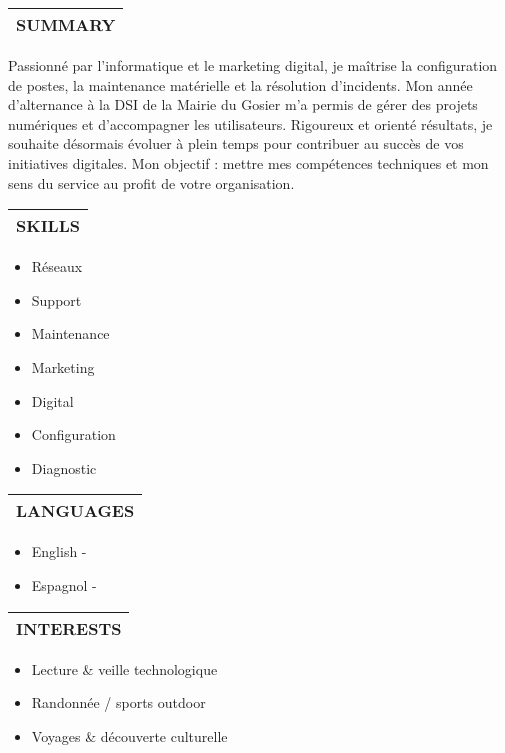 \documentclass{article}
\makeatletter
\newcommand{\cvsection}[1]{%
  \par\bigskip
  \begin{tabular}{@{}p{\linewidth}}
  \textbf{\Large #1}\\[3pt]\hline
  \end{tabular}\medskip}
\makeatother
\begin{document}
\begin{paracol}{2}
\switchcolumn
\centering
{}


\cvsection{SUMMARY}
Passionné par l’informatique et le marketing digital, je maîtrise la configuration de postes, la maintenance matérielle et la résolution d’incidents. Mon année d’alternance à la DSI de la Mairie du Gosier m’a permis de gérer des projets numériques et d’accompagner les utilisateurs. Rigoureux et orienté résultats, je souhaite désormais évoluer à plein temps pour contribuer au succès de vos initiatives digitales. Mon objectif : mettre mes compétences techniques et mon sens du service au profit de votre organisation.

\cvsection{SKILLS}
\begin{itemize}[leftmargin=*]
\item Réseaux
\item Support
\item Maintenance
\item Marketing
\item Digital
\item Configuration
\item Diagnostic\end{itemize}

\cvsection{LANGUAGES}
\begin{itemize}[leftmargin=*]
\item English - \textcolor{gray}{}
\item Espagnol - \textcolor{gray}{}\end{itemize}

\cvsection{INTERESTS}
\begin{itemize}[leftmargin=*]
\item Lecture \& veille technologique
\item Randonnée / sports outdoor
\item Voyages \& découverte culturelle
\end{itemize}

\end{paracol}
\end{document}
